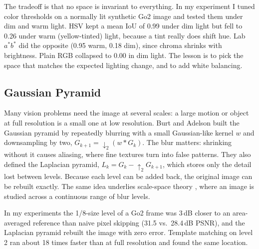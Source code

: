 \documentclass[11pt]{article}
\begin{document}
The tradeoff is that no space is invariant to everything. In my experiment I tuned color thresholds on a normally lit
synthetic Go2 image and tested them under dim and warm light. HSV kept a mean IoU of 0.99 under dim light but fell to 0.26
under warm (yellow-tinted) light, because a tint really does shift hue. Lab $a^*b^*$ did the opposite (0.95 warm, 0.18 dim),
since chroma shrinks with brightness. Plain RGB collapsed to 0.00 in dim light. The lesson is to pick the space that matches the expected lighting change, and to add white balancing.

\subsection{Gaussian Pyramid}
Many vision problems need the image at several scales: a large motion or object at full resolution is a small one at
low resolution. Burt and Adelson \cite{burt} built the Gaussian pyramid by repeatedly blurring with a small Gaussian-like
kernel $w$ and downsampling by two, $G_{k+1} = \downarrow_2 (w * G_k)$. The blur matters: shrinking without it causes
aliasing, where fine textures turn into false patterns. They also defined the Laplacian pyramid, $L_k = G_k -
\uparrow_2 G_{k+1}$, which stores only the detail lost between levels. Because each level can be added back, the original
image can be rebuilt exactly. The same idea underlies scale-space theory \cite{lindeberg}, where an image is studied across
a continuous range of blur levels.

In my experiments the 1/8-size level of a Go2 frame was 3\,dB closer to an area-averaged reference than naive pixel
skipping (31.5 vs.\ 28.4\,dB PSNR), and the Laplacian pyramid rebuilt the image with zero error. Template matching on level 2 ran about 18 times faster than at full resolution and found the same
location.
\end{document}
